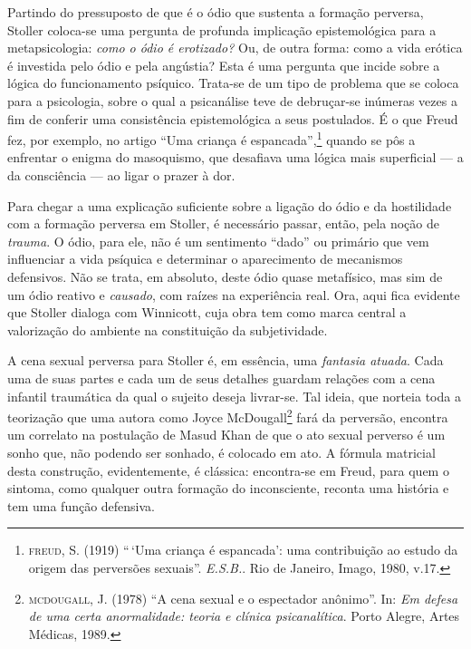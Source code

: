 Partindo do pressuposto de que é o ódio que sustenta a formação perversa,
Stoller coloca-se uma pergunta de profunda implicação epistemológica para a
metapsicologia: \textit{como o ódio é erotizado?} Ou, de outra forma: como
a vida erótica é investida pelo ódio e pela angústia? Esta é uma pergunta
que incide sobre a lógica do funcionamento psíquico. Trata-se de um tipo de
problema que se coloca para a psicologia, sobre o qual a psicanálise teve
de debruçar-se inúmeras vezes a fim de conferir uma consistência
epistemológica a seus postulados. É o que Freud fez, por exemplo, no artigo
``Uma criança é espancada'',\footnote{ \textsc{freud}, S. (1919) ``\,`Uma criança
é espancada': uma contribuição ao estudo da origem das perversões sexuais''.
\textit{E.S.B.}. Rio de Janeiro, Imago, 1980, v.17.} quando se pôs a
enfrentar o enigma do masoquismo, que desafiava uma lógica mais superficial
--- a da consciência --- ao ligar o prazer à dor.

Para chegar a uma explicação suficiente sobre a ligação do ódio e da
hostilidade com a formação perversa em Stoller, é necessário passar, então,
pela noção de \textit{trauma}. O ódio, para ele, não é um sentimento “dado”
ou primário que vem influenciar a vida psíquica e determinar o aparecimento
de mecanismos defensivos. Não se trata, em absoluto, deste ódio quase
metafísico, mas sim de um ódio reativo e \textit{causado}, com raízes na
experiência real. Ora, aqui fica evidente que Stoller dialoga com
Winnicott, cuja obra tem como marca central a valorização do ambiente na
constituição da subjetividade.

A cena sexual perversa para Stoller é, em essência, uma \textit{fantasia
atuada}. Cada uma de suas partes e cada um de seus detalhes guardam
relações com a cena infantil traumática da qual o sujeito deseja livrar-se.
Tal ideia, que norteia toda a teorização que uma autora como Joyce
McDougall\footnote{ \textsc{mcdougall}, J. (1978) “A cena sexual e o espectador
anônimo”. In: \textit{Em defesa de uma certa anormalidade: teoria e clínica
psicanalítica}. Porto Alegre, Artes Médicas, 1989.} fará da perversão,
encontra um correlato na postulação de Masud Khan de que o ato sexual
perverso é um sonho que, não podendo ser sonhado, é colocado em ato. A
fórmula matricial desta construção, evidentemente, é clássica: encontra-se
em Freud, para quem o sintoma, como qualquer outra formação do
inconsciente, reconta uma história e tem uma função defensiva.

